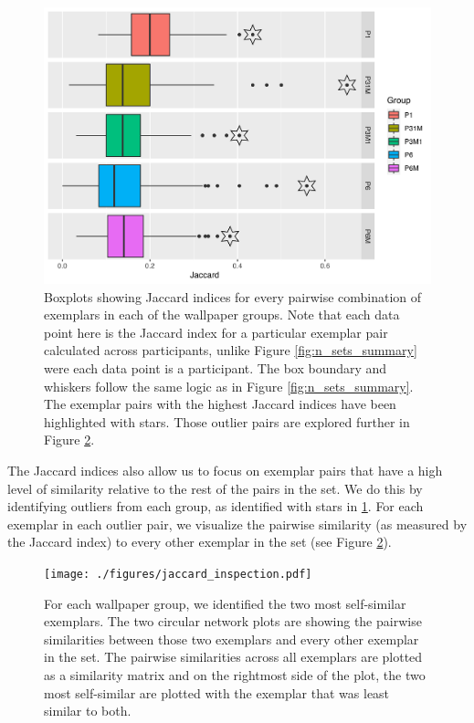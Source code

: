 \documentclass[11pt, twoside]{article}
\begin{document}
\begin{figure}[t]
	\centering
	\includegraphics[width=\linewidth]{./figures/jaccard_summary.pdf}
	\caption{Boxplots showing Jaccard indices for every pairwise combination of exemplars in each of the wallpaper groups. Note that each data point here is the Jaccard index for a particular exemplar pair calculated across participants, unlike Figure \ref{fig:n_sets_summary} were each data point is a participant. The box boundary and whiskers follow the same logic as in Figure \ref{fig:n_sets_summary}. The exemplar pairs with the highest Jaccard indices have been highlighted with stars. Those outlier pairs are explored further in Figure \ref{fig:jaccard_inspection}.}
	\label{fig:jaccard_summary}
\end{figure}

The Jaccard indices also allow us to focus on exemplar pairs that have a high level of similarity relative to the rest of the pairs in the set. We do this by identifying outliers from each group, as identified with stars in \ref{fig:jaccard_summary}. For each exemplar in each outlier pair, we visualize the pairwise similarity (as measured by the Jaccard index) to every other exemplar in the set (see Figure \ref{fig:jaccard_inspection}). 

\begin{figure}[t]
	\centering
	\texttt{[image: ./figures/jaccard\_inspection.pdf]}
	\caption{For each wallpaper group, we identified the two most self-similar exemplars. The two circular network plots are showing the pairwise similarities between those two exemplars and every other exemplar in the set. The pairwise similarities across all exemplars are plotted as a similarity matrix and on the rightmost side of the plot, the two most self-similar are plotted with the exemplar that was least similar to both.}
	\label{fig:jaccard_inspection}
\end{figure}
\end{document}
